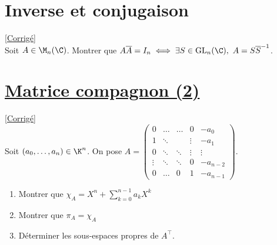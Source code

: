 \documentclass[8pt]{book}
\begin{document}
	\section{Inverse et conjugaison }
	\label{Inverse et conjugaison}
	\textcolor{blue}{\hyperref[Inverse et conjugaison corrigé]{[Corrigé]}}\\
	Soit $A\in \M_n(\C)$. Montrer que $A\overline{A}=I_n \iff \exists S\in \text{GL}_n(\C),\ A=S{\overline S}^{-1}$.
	
	\section{\underline{Matrice compagnon (2)} }
	\label{Matrice compagnon (2)}
	\textcolor{blue}{\hyperref[Matrice compagnon (2) corrigé]{[Corrigé]}}\\
	Soit $(a_0,\dots,a_n)\in \K^n$. On pose $A=
	\begin{pmatrix}
		0&\dots&\dots&0&-a_0\\
		1&\ddots&\ &\vdots&-a_1\\
		0&\ddots&\ddots&\vdots&\vdots\\
		\vdots&\ddots&\ddots&0&-a_{n-2}\\
		0&\dots&0&1&-a_{n-1}
	\end{pmatrix}$.
	\begin{enumerate}
		\item Montrer que $\chi_A=X^n+\displaystyle\sum\limits_{k=0}^{n-1}{a_kX^k}$
		\item Montrer que $\pi_A=\chi_A$
		\item Déterminer les sous-espaces propres de $A^\top$.
	\end{enumerate}
	
\end{document}
